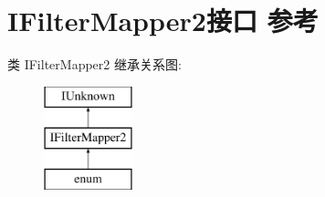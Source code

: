 \hypertarget{interface_i_filter_mapper2}{}\section{I\+Filter\+Mapper2接口 参考}
\label{interface_i_filter_mapper2}
类 I\+Filter\+Mapper2 继承关系图\+:\begin{figure}[H]
\begin{center}
\leavevmode
\includegraphics[height=3.000000cm]{interface_i_filter_mapper2}
\end{center}
\end{figure}
